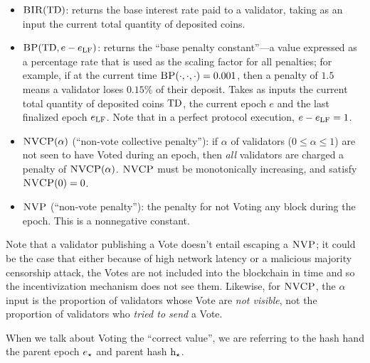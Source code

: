 \documentclass[12pt, final]{article}
\newcommand{\epoch}{\ensuremath{e}\space}
\newcommand{\hash}{\textnormal{h}\space}
\newcommand{\epochsource}{\ensuremath{\epoch_{\star}}\space}
\newcommand{\hashsource}{\ensuremath{\hash_{\star}}\space}
\newcommand{\totaldeposit}{\textnormal{TD}\space}
\newcommand{\epochLF}{\ensuremath{\epoch_{\textnormal{LF}}}\space}
\newcommand{\BIR}{\textsc{BIR}\space}
\newcommand{\BP}{\textsc{BP}\space}
\newcommand{\NVP}{\textsc{NVP}\space}
\newcommand{\NVCP}{\textsc{NVCP}\space}
\begin{document}
\begin{itemize}
\item $\BIR(\totaldeposit)$: returns the base interest rate paid to a validator, taking as an input the current total quantity of deposited coins.

\item $\BP(\totaldeposit, \epoch - \epochLF )$: returns the ``base penalty constant''---a value expressed as a percentage rate that is used as the scaling factor for all penalties; for example, if at the current time $\BP(\cdot, \cdot, \cdot) = 0.001$, then a penalty of $1.5$ means a validator loses $0.15\%$ of their deposit. Takes as inputs the current total quantity of deposited coins $\totaldeposit$, the current epoch $e$ and the last finalized epoch \epochLF. Note that in a perfect protocol execution, $\epoch - \epochLF = 1$.

\item $\NVCP(\alpha)$ (``non-vote collective penalty''): if $\alpha$ of validators ($0 \leq \alpha \leq 1$) are not seen to have Voted during an epoch, then \emph{all} validators are charged a penalty of $\NVCP(\alpha)$. $\NVCP$ must be monotonically increasing, and satisfy $\NVCP(0) = 0$. 

\item $\NVP$ (``non-vote penalty''): the penalty for not Voting any block during the epoch. This is a nonnegative constant. 

\end{itemize}


Note that a validator publishing a Vote doesn't entail escaping a $\NVP$; it could be the case that either because of high network latency or a malicious majority censorship attack, the Votes are not included into the blockchain in time and so the incentivization mechanism does not see them. Likewise, for $\NVCP$, the $\alpha$ input is the proportion of validators whose Vote are \emph{not visible}, not the proportion of validators who \emph{tried to send} a Vote.

When we talk about Voting the ``correct value'', we are referring to the hash \hash and the parent epoch $\epochsource$ and parent hash $\hashsource$.
\end{document}
